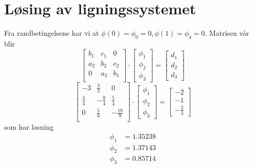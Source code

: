 \section{Løsing av ligningssystemet} %
\label{sec:l_sing_av_ligningssystemet}
Fra randbetingelsene har vi at $\phi(0)=\phi_0=0, \phi(1)=\phi_4=0$. Matrisen vår blir
\begin{equation}
  \begin{bmatrix}
    b_1 & c_1 & 0   \\
    a_2 & b_2 & c_2 \\
    0   & a_3 & b_3 \\
  \end{bmatrix}
  \cdot
  \begin{bmatrix}
    \phi_1 \\ \phi_2 \\ \phi_3
  \end{bmatrix}
  =
  \begin{bmatrix}
    d_1 \\ d_2 \\ d_3
  \end{bmatrix}
\end{equation}
\begin{equation}
  \begin{bmatrix}
    -3          &  \frac{3}{2} & 0 \\
    \frac{3}{4} & -\frac{9}{4} &  \frac{5}{4} \\
    0           & \frac{5}{6}  & -\frac{19}{9} \\
  \end{bmatrix}
  \cdot
  \begin{bmatrix}
    \phi_1 \\ \phi_2 \\ \phi_3
  \end{bmatrix}
  =
  \begin{bmatrix}
    -2 \\ -1 \\ -\frac{2}{3}
  \end{bmatrix}
\end{equation}
som har løsning
\begin{align}
  \phi_1 &= 1.35238 \nonumber \\
  \phi_2 &= 1.37143 \nonumber\\
  \phi_3 &= 0.85714 \nonumber
\end{align}





